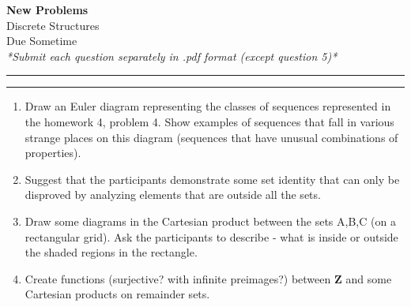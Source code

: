 \documentclass[a4paper,12pt]{article}
\newcommand\Z{\mathbf{Z}}
\begin{document}
\begin{center}
{\bf\Huge New Problems} \\[5pt]
Discrete Structures \\
Due Sometime\\[5pt]
\textit{*Submit each question separately in .pdf format (except question 5)*}
\end{center}

\hrule
\vspace{2pt}
\hrule
\vspace{12pt}

\begin{enumerate}
\item Draw an Euler diagram representing the classes of sequences 
represented in the homework 4, problem 4. 
Show examples of sequences that fall in various strange places on this diagram
(sequences that have unusual combinations of properties).
\item Suggest that the participants demonstrate some set identity that
can only be disproved by analyzing elements that are outside all the sets. 
\item Draw some diagrams in the Cartesian product between the sets A,B,C
(on a rectangular grid). Ask the participants to describe - what is inside or outside the shaded regions in the rectangle. 
\item Create functions (surjective? with infinite preimages?) between 
$\Z$ and some Cartesian products on remainder sets.
 
\end{enumerate}
\end{document}
